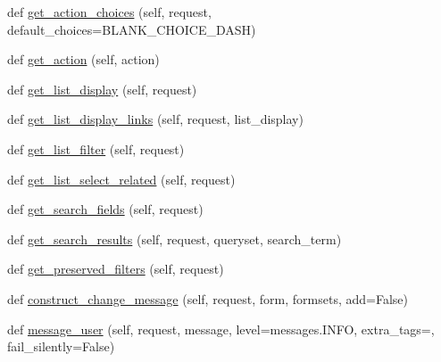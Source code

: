 \begin{DoxyCompactItemize}
\item 
def \mbox{\hyperlink{classdjango_1_1contrib_1_1admin_1_1options_1_1_model_admin_a258bcfa129d648c16350eb834599619e}{get\+\_\+action\+\_\+choices}} (self, request, default\+\_\+choices=B\+L\+A\+N\+K\+\_\+\+C\+H\+O\+I\+C\+E\+\_\+\+D\+A\+SH)
\item 
def \mbox{\hyperlink{classdjango_1_1contrib_1_1admin_1_1options_1_1_model_admin_a05404ec2d84db4077177ae2b774e14f7}{get\+\_\+action}} (self, action)
\item 
def \mbox{\hyperlink{classdjango_1_1contrib_1_1admin_1_1options_1_1_model_admin_a59fd2d5fcec29211f783e172c6c6d004}{get\+\_\+list\+\_\+display}} (self, request)
\item 
def \mbox{\hyperlink{classdjango_1_1contrib_1_1admin_1_1options_1_1_model_admin_a3a30bee411c386f816945834c44d8487}{get\+\_\+list\+\_\+display\+\_\+links}} (self, request, list\+\_\+display)
\item 
def \mbox{\hyperlink{classdjango_1_1contrib_1_1admin_1_1options_1_1_model_admin_a6249b8f66b16ecd7550d76f58ca7b08c}{get\+\_\+list\+\_\+filter}} (self, request)
\item 
def \mbox{\hyperlink{classdjango_1_1contrib_1_1admin_1_1options_1_1_model_admin_a2da21c8b75902dda86e16d521f6d600a}{get\+\_\+list\+\_\+select\+\_\+related}} (self, request)
\item 
def \mbox{\hyperlink{classdjango_1_1contrib_1_1admin_1_1options_1_1_model_admin_ae2c21be64ea9b1d300305dec79ded29f}{get\+\_\+search\+\_\+fields}} (self, request)
\item 
def \mbox{\hyperlink{classdjango_1_1contrib_1_1admin_1_1options_1_1_model_admin_a98f33621761824f1416f60b27de35b19}{get\+\_\+search\+\_\+results}} (self, request, queryset, search\+\_\+term)
\item 
def \mbox{\hyperlink{classdjango_1_1contrib_1_1admin_1_1options_1_1_model_admin_a7ef4e53bb5ae008991aa2bb9ce5e4810}{get\+\_\+preserved\+\_\+filters}} (self, request)
\item 
def \mbox{\hyperlink{classdjango_1_1contrib_1_1admin_1_1options_1_1_model_admin_a272a3481b4efcddff16312fb282ecc46}{construct\+\_\+change\+\_\+message}} (self, request, form, formsets, add=False)
\item 
def \mbox{\hyperlink{classdjango_1_1contrib_1_1admin_1_1options_1_1_model_admin_a7f79d20a4e8dbea317c386e068e60f10}{message\+\_\+user}} (self, request, message, level=messages.\+I\+N\+FO, extra\+\_\+tags=\textquotesingle{}\textquotesingle{}, fail\+\_\+silently=False)
\item 

\end{DoxyCompactItemize}
